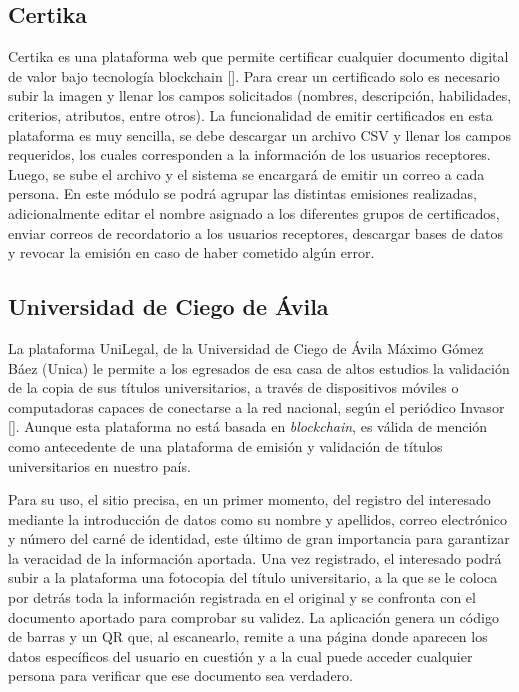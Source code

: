 \subsection{Certika}
Certika es una plataforma web que permite certificar cualquier documento digital de valor bajo tecnología blockchain [\cite{88}]. Para crear un certificado solo es necesario subir la imagen y llenar los campos solicitados (nombres, descripción, habilidades, criterios, atributos, entre otros). La funcionalidad de emitir certificados en esta plataforma es muy sencilla, se debe descargar un archivo CSV y llenar los campos requeridos, los cuales corresponden a la información de los usuarios receptores. Luego, se sube el archivo y el sistema se encargará de emitir un correo a cada persona. En este módulo se podrá agrupar las distintas emisiones realizadas, adicionalmente editar el nombre asignado a los diferentes grupos de certificados, enviar correos de recordatorio a los usuarios receptores, descargar bases de datos y revocar la emisión en caso de haber cometido algún error.

\subsection{Universidad de Ciego de Ávila}
La plataforma UniLegal, de la Universidad de Ciego de Ávila Máximo Gómez Báez (Unica) le permite a los egresados de esa casa de altos estudios la validación de la copia de sus títulos universitarios, a través de dispositivos móviles o computadoras capaces de conectarse a la red nacional, según el periódico Invasor [\cite{90}]. Aunque esta plataforma no está basada en \textit{blockchain}, es válida de mención como antecedente de una plataforma de emisión y validación de títulos universitarios en nuestro país.

Para su uso, el sitio precisa, en un primer momento, del registro del interesado mediante la introducción de datos como su nombre y apellidos, correo electrónico y número del carné de identidad, este último de gran importancia para garantizar la veracidad de la información aportada. Una vez registrado, el interesado podrá subir a la plataforma una fotocopia del título universitario, a la que se le coloca por detrás toda la información registrada en el original y se confronta con el documento aportado para comprobar su validez. La aplicación genera un código de barras y un QR que, al escanearlo, remite a una página donde aparecen los datos específicos del usuario en cuestión y a la cual puede acceder cualquier persona para verificar que ese documento sea verdadero.


